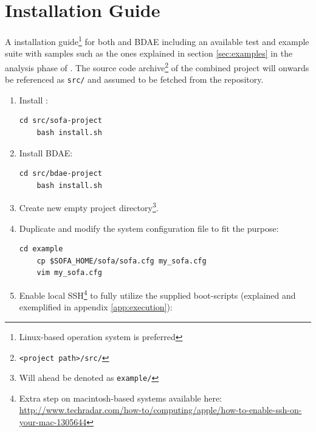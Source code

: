 \chapter{Installation Guide} \label{app:installation}

A installation guide\footnote{Linux-based operation system is preferred} for both \CodeName and BDAE including an available test and example suite with samples such as the ones explained in section \ref{sec:examples} in the analysis phase of \CodeName. The source code archive\footnote{\texttt{<project path>/src/}} of the combined project will onwards be referenced as \texttt{src/} and assumed to be fetched from the repository.

\begin{enumerate}
	\item Install \CodeName:
	
	\begin{lstlisting}[numbers=none, backgroundcolor=\color{sourcebackground}, rulecolor=\color{sourcebackground}, framextopmargin=5pt, framexbottommargin=5pt, frame=tb, xrightmargin=15pt]
	cd src/sofa-project
	bash install.sh
	\end{lstlisting}
	\vspace*{-6mm}
	\item Install BDAE:
	
	\begin{lstlisting}[numbers=none, backgroundcolor=\color{sourcebackground}, rulecolor=\color{sourcebackground}, framextopmargin=5pt, framexbottommargin=5pt, frame=tb, xrightmargin=15pt]
	cd src/bdae-project
	bash install.sh
	\end{lstlisting}
	\vspace*{-6mm}
	\item Create new empty project directory\footnote{Will ahead be denoted as \texttt{example/}}.
	\item Duplicate and modify the system configuration file to fit the purpose:
	
	\begin{lstlisting}[numbers=none, backgroundcolor=\color{sourcebackground}, rulecolor=\color{sourcebackground}, framextopmargin=5pt, framexbottommargin=5pt, frame=tb, xrightmargin=15pt]
	cd example
	cp $SOFA_HOME/sofa/sofa.cfg my_sofa.cfg
	vim my_sofa.cfg
	\end{lstlisting}
	
	\item Enable local SSH\footnote{Extra step on macintosh-based systems available here: \url{http://www.techradar.com/how-to/computing/apple/how-to-enable-ssh-on-your-mac-1305644}} to fully utilize the supplied boot-scripts (explained and exemplified in appendix \ref{app:execution}):
	

\end{enumerate}
